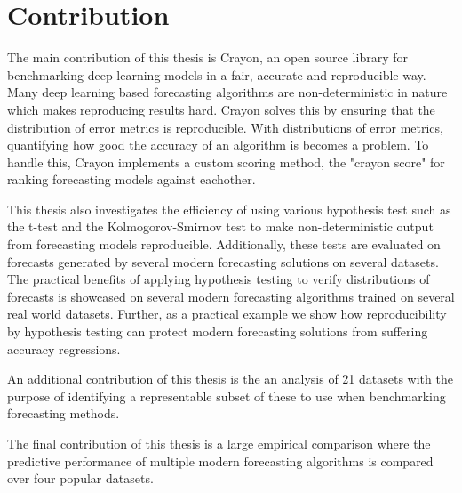 \section{Contribution}
\label{section:contribution}

The main contribution of this thesis is Crayon, an open source library for benchmarking deep learning models in a fair, accurate and reproducible way. Many deep learning based forecasting algorithms are non-deterministic in nature which makes reproducing results hard. Crayon solves this by ensuring that the distribution of error metrics is reproducible. With distributions of error metrics, quantifying how good the accuracy of an algorithm is becomes a problem. To handle this, Crayon implements a custom scoring method, the "crayon score" for ranking forecasting models against eachother. 

This thesis also investigates the efficiency of using various hypothesis test such as the t-test and the Kolmogorov-Smirnov test to make non-deterministic output from forecasting models reproducible. Additionally, these tests are evaluated on forecasts generated by several modern forecasting solutions on several datasets. The practical benefits of applying hypothesis testing to verify distributions of forecasts is showcased on several modern forecasting algorithms trained on several real world datasets. Further, as a practical example we show how reproducibility by hypothesis testing can protect modern forecasting solutions from suffering accuracy regressions. 

An additional contribution of this thesis is the an analysis of 21 datasets with the purpose of identifying a representable subset of these to use when benchmarking forecasting methods.

The final contribution of this thesis is a large empirical comparison where the predictive performance of multiple modern forecasting algorithms is compared over four popular datasets.
